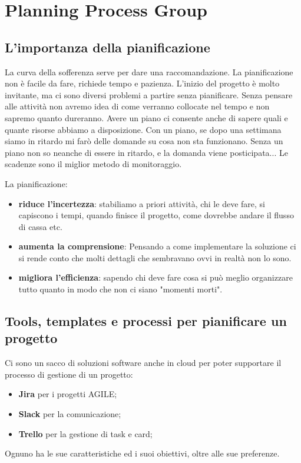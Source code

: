 \section{Planning Process Group}
\subsection{L’importanza della pianificazione}
La curva della sofferenza serve per dare una raccomandazione. La pianificazione non è facile da fare, richiede tempo e pazienza. L'inizio del progetto è molto invitante, ma ci sono diversi problemi a partire senza pianificare. Senza pensare alle attività non avremo idea di come verranno collocate nel tempo e non sapremo quanto dureranno. Avere un piano ci consente anche di sapere quali e quante risorse abbiamo a disposizione.
\noindent Con un piano, se dopo una settimana siamo in ritardo mi farò delle domande su cosa non sta funzionano. Senza un piano non so neanche di essere in ritardo, e la domanda viene posticipata...
Le scadenze sono il miglior metodo di monitoraggio.

\noindent La pianificazione:
\begin{itemize}
	\item \textbf{riduce l'incertezza}: stabiliamo a priori attività, chi le deve fare, si capiscono i tempi, quando finisce il progetto, come dovrebbe andare il flusso di cassa etc.
	\item \textbf{aumenta la comprensione}: Pensando a come implementare la soluzione ci si rende conto che molti dettagli che sembravano ovvi in realtà non lo sono.
	\item \textbf{migliora l'efficienza}: sapendo chi deve fare cosa si può meglio organizzare tutto quanto in modo che non ci siano "momenti morti".
\end{itemize}

\subsection{Tools, templates e processi per pianificare un progetto}
Ci sono un sacco di soluzioni software anche in cloud per poter supportare il processo di gestione di un progetto:
\begin{itemize}
	\item \textbf{Jira} per i progetti AGILE;
	\item \textbf{Slack} per la comunicazione;
	\item \textbf{Trello} per la gestione di task e card;
\end{itemize}
Ognuno ha le sue caratteristiche ed i suoi obiettivi, oltre alle sue preferenze.
